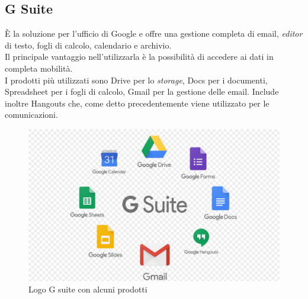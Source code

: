     \subsection{G Suite}
      È la soluzione per l'ufficio di Google e offre una gestione completa di email, \textit{editor} di testo, fogli di calcolo, calendario e archivio.\\
      Il principale vantaggio nell'utilizzarla è la possibilità di accedere ai dati in completa mobilità.\\
      I prodotti più utilizzati sono Drive per lo \textit{storage}, Docs per i documenti, Spreadsheet per i fogli di calcolo, Gmail per la gestione delle email. Include inoltre Hangouts che, come detto precedentemente viene utilizzato per le comunicazioni.
      \begin{figure}[h]
        \centering
        \includegraphics[scale=0.2]{immagini/gsuite.png}
        \caption{Logo G suite con alcuni prodotti}
        \label{logog}
      \end{figure}
      \newpage
      \null
      \thispagestyle{empty}
      \newpage
